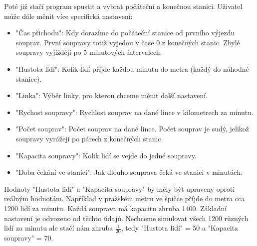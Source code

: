 \documentclass[12pt, a4paper]{article}
\begin{document}
Poté již stačí program spustit a vybrat počáteční a konečnou stanici. Uživatel může dále měnit více specifická nastavení:
\begin{itemize}
    \item "Čas přichodu": Kdy dorazíme do počáteční stanice od prvního výjezdu souprav. První soupravy totiž vyjedou v čase 0 z konečných stanic. Zbylé soupravy vyjíždějí po 5 minutových intervalech.
    \item "Hustota lidí": Kolik lidí příjde každou minutu do metra (každý do náhodné stanice).
    \item "Linka": Výběr linky, pro kterou chceme měnit další nastavení.
    \item "Rychost soupravy": Rychlost souprav na dané lince v kilometrech za minutu.
    \item "Počet souprav": Počet souprav na dané lince. Počet souprav je sudý, jelikož soupravy vyrážejí po párech z konečných stanic.
    \item "Kapacita soupravy": Kolik lidí se vejde do jedné soupravy.
    \item "Doba čekání ve stanici": Jak dlouho souprava čeká ve stanici v minutách.
\end{itemize}

Hodnoty "Hustota lidí" a "Kapacita soupravy" by měly být upraveny oproti reálným hodnotám. Například v pražském metru ve špičce příjde do metra cca 1200 lidí za minutu. Každá souprava má kapacitu zhruba 1400. Základní nastavení je odvozeno od těchto údajů. Nechceme simulovat všech 1200 různých lidí za minutu ale stačí nám zhruba $\frac{1}{20}$, tedy "Hustota lidí" = 50 a "Kapacita soupravy" = 70.
\end{document}
